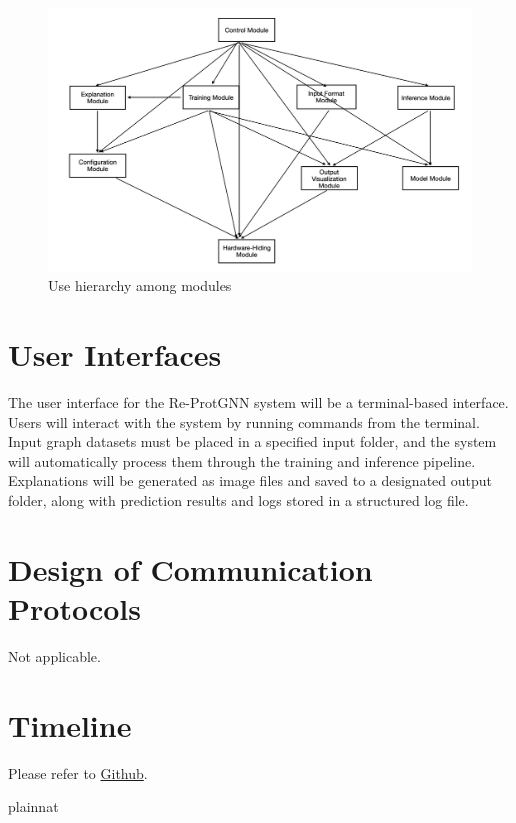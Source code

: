 \documentclass[12pt, titlepage]{article}
\begin{document}
\begin{figure}[H]
\centering
\includegraphics[width=1\textwidth]{UsesHierarchy.png}
\caption{Use hierarchy among modules}
\label{FigUH}
\end{figure}


\section{User Interfaces}

The user interface for the Re-ProtGNN system will be a terminal-based interface. Users will interact with the system by running commands from the terminal. Input graph datasets must be placed in a specified input folder, and the system will automatically process them through the training and inference pipeline. Explanations will be generated as image files and saved to a designated output folder, along with prediction results and logs stored in a structured log file.

\section{Design of Communication Protocols}

Not applicable.

\section{Timeline}

Please refer to \href{https://github.com/Yuanqi-X/Re-ProtGNN/tree/main}{Github}.

 {plainnat}

%

\newpage{}
\end{document}
